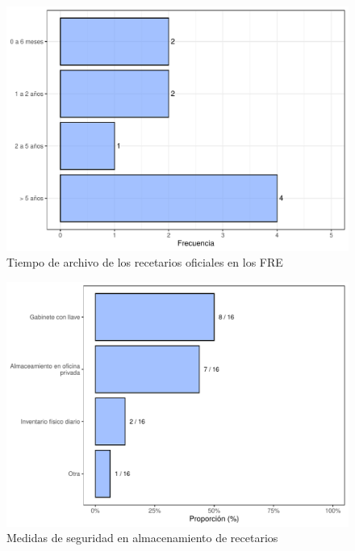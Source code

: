 \documentclass[
]{book}
\begin{document}
\begin{figure}
\includegraphics[width=0.85\linewidth]{InformeFinal_files/figure-latex/TiempoArchivoRecetariosOficiales-1} \caption{Tiempo de archivo de los recetarios oficiales en los FRE}\label{fig:TiempoArchivoRecetariosOficiales}
\end{figure}

\begin{figure}
\includegraphics[width=0.85\linewidth]{InformeFinal_files/figure-latex/MedidasSeguridad-Almacenamiento-1} \caption{Medidas de seguridad en almacenamiento de recetarios}\label{fig:MedidasSeguridad-Almacenamiento}
\end{figure}
\end{document}
